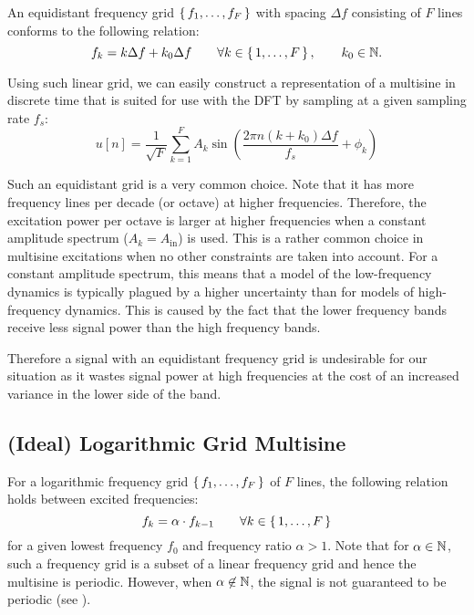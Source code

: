   An equidistant frequency grid $\set{f_1, \ldots, f_F}$ with spacing $\Delta f$
  consisting of $F$ lines conforms to the following relation:
  \begin{equation}
    f_k = k \Delta f + k_0 \Delta f
    \qquad \forall k \in \set{1,\ldots,F},
    \qquad k_0 \in \mathbb{N}
    \text{.}
  \label{eq:excitation:linGrid}
  \end{equation}
  
  Using such linear grid, we can easily construct a representation of a multisine
  in discrete time that is suited for use with the \gls{DFT} by sampling at a given sampling rate $f_s$:
  \begin{equation}
     u \left[ n\right] = \frac{1}{\sqrt{F}}
     \sum_{k=1}^{F} 
       A_k 
       \sin 
         \left(\frac{2\pi n \left( k + k_0 \right) \Delta f}{f_s} + \phi_k \right)
    \label{eq:excitation:MultiSineDT}
  \end{equation}
  
  Such an equidistant grid is a very common choice.
  Note that it has more frequency lines per decade (or octave) at higher frequencies.
  Therefore, the excitation power per octave is larger at higher frequencies
  when a constant amplitude spectrum ($A_k = A_{\mathrm{in}}$) is used.
  This is a rather common choice in multisine excitations when no other constraints are taken into account.
  For a constant amplitude spectrum, this means that a model of the low-frequency dynamics is typically plagued by a higher uncertainty than for models of high-frequency dynamics.
  This is caused by the fact that the lower frequency bands receive less signal power than the high frequency bands.
  
  Therefore a signal with an equidistant frequency grid is undesirable for
  our situation as it wastes signal power at high frequencies at the cost of an increased variance in the lower side of the band.
  
\subsection{(Ideal) Logarithmic Grid Multisine}
  For a logarithmic frequency grid $\set{f_1, \ldots, f_F}$ of $F$ lines, the following relation holds between excited frequencies:
  \begin{equation}
    f_k = \alpha \cdot f_{k-1}
    \qquad \forall k \in \set{1,\ldots,F}
  \label{eq:excitation:logGrid}
  \end{equation}
  for a given lowest frequency $f_0$ and frequency ratio $\alpha > 1$.
  Note that for $\alpha \in \mathbb{N}$, such a frequency grid is a subset of a linear frequency grid and hence the multisine is periodic.
  However, when $\alpha \not\in \mathbb{N}$, the signal is not guaranteed to be periodic (see ).

